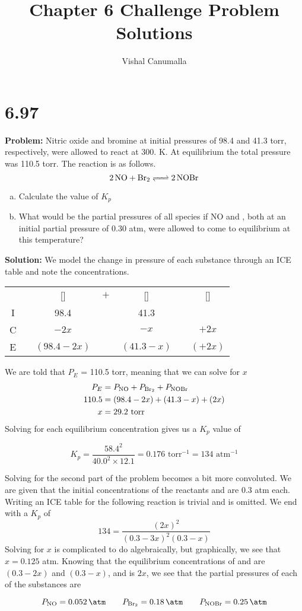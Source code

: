 \documentclass[11 pt]{article}
\title{Chapter 6 Challenge Problem Solutions}
\author{Vishal Canumalla}
\makeatletter
\newcommand{\icetable}[9]{
    \begin{tabular}{cc@{}c@{}c@{}c@{}c@{}c}

    & &   [\ce{#2#1}]& ${}+{}$ & [\ce{#4#3}] & \ce{<=>}& [\ce{#6#5}]\\
 
  I & &       #7    &&   #8                      &&  #9    \\
  C & &       $- #2x$    &&   $- #4x$                         &&  $+ #6x$    \\
  E & &       $(#7 - #2x)$    &&   $(#8 - #4x)$                         &&  $(#9 + #6x)$    \\
 
    \end{tabular}


}
\makeatother
\begin{document}
\maketitle

\section*{6.97} 
\begin{problemBox}
  

\textbf{Problem:} Nitric oxide and bromine at initial pressures of 98.4 and 41.3 torr, respectively, were allowed to react at 300. K. At equilibrium the total pressure was 110.5 torr. The reaction is as follows.
$$\ce{2NO + Br2 <=> 2NOBr}$$
\begin{enumerate}[a)]
    \item Calculate the value of $K_p$
    \item What would be the partial pressures of all species if
NO and , both at an initial partial pressure of
0.30 atm, were allowed to come to equilibrium at
this temperature?
\end{enumerate}
\end{problemBox}
\textbf{Solution:} We model the change in pressure of each substance through an ICE table and note the concentrations.
\begin{center}
 \icetable{NO}{2}{Br2}{}{NOBr}{2}{98.4}{41.3}{}
\end{center}
We are told that $P_{E}$ = 110.5 torr, meaning that we can solve for $x$
\begin{align*}
P_E &= P_{\ce{NO}} + P_{\ce{Br2}} + P_{\ce{NOBr}} \\
    110.5 &= (98.4 - 2x) + (41.3 - x) + (2x) \\
    x &= 29.2 \text{ torr}
\end{align*}
Solving for each equilibrium concentration gives us a $K_p$ value of 
\begin{answerBox}
  $$K_p = \frac{58.4^2}{40.0^2 \times 12.1} = 0.176 \text{ torr}^{-1} = 134 \text{ atm}^{-1}$$
\end{answerBox}
Solving for the second part of the problem becomes a bit more convoluted. We are given that the initial concentrations of the reactants  and  are 
0.3 atm each. Writing an ICE table for the following reaction is trivial and is omitted. We end with a $K_p$ of 
$$134 =  \frac{(2x)^2}{(0.3-3x)^2(0.3-x)}$$
Solving for $x$ is complicated to do algebraically, but graphically, we see that $x = 0.125$ atm. Knowing
that the equilibrium concentrations of  and  are $(0.3 - 2x)$ and $(0.3 - x)$, and 
 is $2x$, we see that the partial pressures of each of the substances are
\begin{answerBox}
  $$ P_{\ce{NO}} = \SI{0.052}{\atm} \qquad P_{\ce{Br2}} = \SI{0.18}{\atm} \qquad P_{\ce{NOBr}} = \SI{0.25}{\atm}$$
\end{answerBox}
\end{document}
